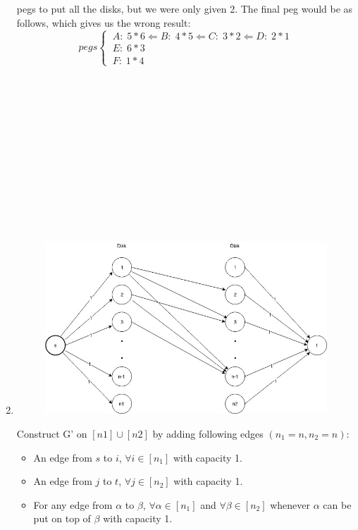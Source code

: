 \documentclass[14pt]{article}
\begin{document}
\begin{enumerate}
pegs to put all the disks, but we were only given 2. The final peg would be as 
follows, which gives us the wrong result:
\[
    pegs  \left\{
        \begin{array}{ll}
        \ A:\;5*6 \Leftarrow B:\;4*5 \Leftarrow C:\;3*2 \Leftarrow D:\;2*1 \\
        \ E:\;6*3\\
        \ F:\;1*4     
        \end{array}
    \right.
\]
\\\\\\\\\\\\\\\\\\\\\\\\
\item 
\begin{figure}
    \centering
    \includegraphics[width =150mm]{hello.jpg} \\
\end{figure}
Construct G' on $[n1]\cup[n2]$ by adding following edges $(n_1 = n, n_2 = n)$:
\begin{itemize}
    \item An edge from $s$ to $i$, $\forall i \in [n_1]$ with capacity 1.
    \item An edge from $j$ to $t$, $\forall j \in [n_2]$ with capacity 1.
    \item For any edge from $\alpha$ to $\beta$, $\forall \alpha \in [n_1]$ and
    $\forall \beta \in [n_2]$ whenever $\alpha$ can be put on top of $\beta$ with
    capacity 1.

\end{itemize}
\end{enumerate}
\end{document}
